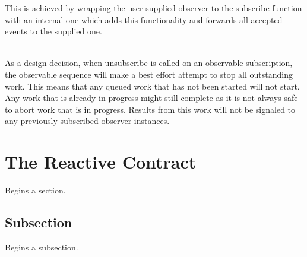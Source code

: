 This is achieved by wrapping the user supplied observer to the subscribe function with an internal one which adds this functionality and forwards all accepted events to the supplied one.

\\

As a design decision, when unsubscribe is called on an observable subscription, the observable sequence will make a best effort attempt to stop all outstanding work. This means that any queued work that has not been started will not start. Any work that is already in progress might still complete as it is not always safe to abort work that is in progress. Results from this work will not be signaled to any previously subscribed observer instances.



\section{The Reactive Contract}
\label{sec:sec01}

Begins a section.

\subsection{Subsection}
\label{subsec:subsec01}

Begins a subsection.

\listoftodos

